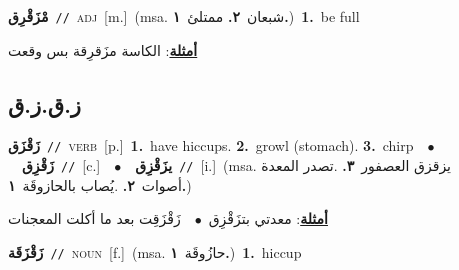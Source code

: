 \documentclass[10pt,a4paper,twoside]{article} %
\begin{document}
\begin{multicols}{2}
{\setlength\topsep{0pt}\textbf{\foreignlanguage{arabic}{مْزَقْرِق}}\ {\color{gray}\texttt{//}\color{black}}\ \textsc{adj}\ [m.]\ \color{gray}(msa. \foreignlanguage{arabic}{شبعان}~\foreignlanguage{arabic}{\textbf{٢.}}  \foreignlanguage{arabic}{ممتلئ}~\foreignlanguage{arabic}{\textbf{١.}})\color{black}\ \textbf{1.}~be full\  \begin{flushright}\color{gray}\foreignlanguage{arabic}{\textbf{\underline{\foreignlanguage{arabic}{أمثلة}}}: الكاسة مزَقرِقة بس وقعت}\end{flushright}\color{black}} \vspace{2mm}

\vspace{-3mm}
\subsection*{\color{blue}\foreignlanguage{arabic}{ز.ق.ز.ق}\color{blue}{}} 

{\setlength\topsep{0pt}\textbf{\foreignlanguage{arabic}{زَقْزَق}}\ {\color{gray}\texttt{//}\color{black}}\ \textsc{verb}\ [p.]\ \textbf{1.}~have hiccups.  \textbf{2.}~growl (stomach).  \textbf{3.}~chirp\ \ $\bullet$\ \ \setlength\topsep{0pt}\textbf{\foreignlanguage{arabic}{زَقْزِق}}\ {\color{gray}\texttt{//}\color{black}}\ [c.]\ \ $\bullet$\ \ \setlength\topsep{0pt}\textbf{\foreignlanguage{arabic}{يزَقْزِق}}\ {\color{gray}\texttt{//}\color{black}}\ [i.]\ \color{gray}(msa. \foreignlanguage{arabic}{يزقزق العصفور}~\foreignlanguage{arabic}{\textbf{٣.}}  .\foreignlanguage{arabic}{تصدر المعدة أصوات}~\foreignlanguage{arabic}{\textbf{٢.}}  .\foreignlanguage{arabic}{يُصاب بالحازوقَة}~\foreignlanguage{arabic}{\textbf{١.}})\color{black}\  \begin{flushright}\color{gray}\foreignlanguage{arabic}{\textbf{\underline{\foreignlanguage{arabic}{أمثلة}}}: معدتي بتزَقْزِق\ $\bullet$\ \  زَقْزَقِت  بعد ما أكلت المعجنات}\end{flushright}\color{black}} \vspace{2mm}

{\setlength\topsep{0pt}\textbf{\foreignlanguage{arabic}{زَقْزَقَة}}\ {\color{gray}\texttt{//}\color{black}}\ \textsc{noun}\ [f.]\ \color{gray}(msa. \foreignlanguage{arabic}{حازُوقَة}~\foreignlanguage{arabic}{\textbf{١.}})\color{black}\ \textbf{1.}~hiccup\ } \vspace{2mm}


\end{multicols}
\end{document}
